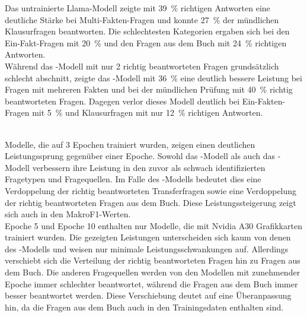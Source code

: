 Das untrainierte Llama-Modell zeigte mit \SI{39}{\percent} richtigen Antworten eine deutliche Stärke bei Multi-Fakten-Fragen und konnte \SI{27}{\percent} der mündlichen Klausurfragen beantworten.
Die schlechtesten Kategorien ergaben sich bei den Ein-Fakt-Fragen mit \SI{20}{\percent} und den Fragen aus dem Buch mit \SI{24}{\percent} richtigen Antworten.\\

Während das \liv-Modell mit nur 2 richtig beantworteten Fragen grundsätzlich schlecht abschnitt,
zeigte das \lia-Modell mit \SI{36}{\percent} eine deutlich bessere Leistung bei Fragen mit mehreren Fakten
und bei der mündlichen Prüfung mit \SI{40}{\percent} richtig beantworteten Fragen.
Dagegen verlor dieses Modell deutlich bei Ein-Fakten-Fragen mit \SI{5}{\percent} und Klausurfragen mit nur \SI{12}{\percent} richtigen Antworten.\\\

Modelle, die auf 3 Epochen trainiert wurden, zeigen einen deutlichen Leistungssprung gegenüber einer Epoche.
Sowohl das \lev-Modell als auch das \lea-Modell verbessern ihre Leistung in den zuvor als schwach identifizierten Fragetypen und Fragequellen.
Im Falle des \lea-Modells bedeutet dies eine Verdoppelung der richtig beantworteten Transferfragen sowie eine Verdoppelung der richtig beantworteten Fragen aus dem Buch.
Diese Leistungssteigerung zeigt sich auch in den MakroF1-Werten.\\

Epoche 5 und Epoche 10 enthalten nur Modelle, die mit Nvidia A30 Grafikkarten trainiert wurden.
Die gezeigten Leistungen unterscheiden sich kaum von denen des \lea-Modells und weisen nur minimale Leistungsschwankungen auf.
Allerdings verschiebt sich die Verteilung der richtig beantworteten Fragen hin zu Fragen aus dem Buch.
Die anderen Fragequellen werden von den Modellen mit zunehmender Epoche immer schlechter beantwortet, während die Fragen aus dem Buch immer besser beantwortet werden.
Diese Verschiebung deutet auf eine Überanpassung hin, da die Fragen aus dem Buch auch in den Trainingsdaten enthalten sind.\\


